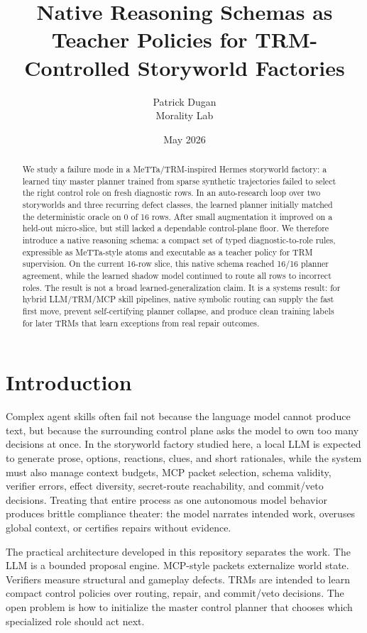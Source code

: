 \documentclass[11pt]{article}
\title{Native Reasoning Schemas as Teacher Policies for TRM-Controlled Storyworld Factories}
\author{Patrick Dugan\\Morality Lab}
\date{May 2026}
\begin{document}
\maketitle

\begin{abstract}
We study a failure mode in a MeTTa/TRM-inspired Hermes storyworld factory: a learned tiny master planner trained from sparse synthetic trajectories failed to select the right control role on fresh diagnostic rows. In an auto-research loop over two storyworlds and three recurring defect classes, the learned planner initially matched the deterministic oracle on 0 of 16 rows. After small augmentation it improved on a held-out micro-slice, but still lacked a dependable control-plane floor. We therefore introduce a native reasoning schema: a compact set of typed diagnostic-to-role rules, expressible as MeTTa-style atoms and executable as a teacher policy for TRM supervision. On the current 16-row slice, this native schema reached 16/16 planner agreement, while the learned shadow model continued to route all rows to incorrect roles. The result is not a broad learned-generalization claim. It is a systems result: for hybrid LLM/TRM/MCP skill pipelines, native symbolic routing can supply the fast first move, prevent self-certifying planner collapse, and produce clean training labels for later TRMs that learn exceptions from real repair outcomes.
\end{abstract}

\section{Introduction}

Complex agent skills often fail not because the language model cannot produce text, but because the surrounding control plane asks the model to own too many decisions at once. In the storyworld factory studied here, a local LLM is expected to generate prose, options, reactions, clues, and short rationales, while the system must also manage context budgets, MCP packet selection, schema validity, verifier errors, effect diversity, secret-route reachability, and commit/veto decisions. Treating that entire process as one autonomous model behavior produces brittle compliance theater: the model narrates intended work, overuses global context, or certifies repairs without evidence.

The practical architecture developed in this repository separates the work. The LLM is a bounded proposal engine. MCP-style packets externalize world state. Verifiers measure structural and gameplay defects. TRMs are intended to learn compact control policies over routing, repair, and commit/veto decisions. The open problem is how to initialize the master control planner that chooses which specialized role should act next.
\end{document}
